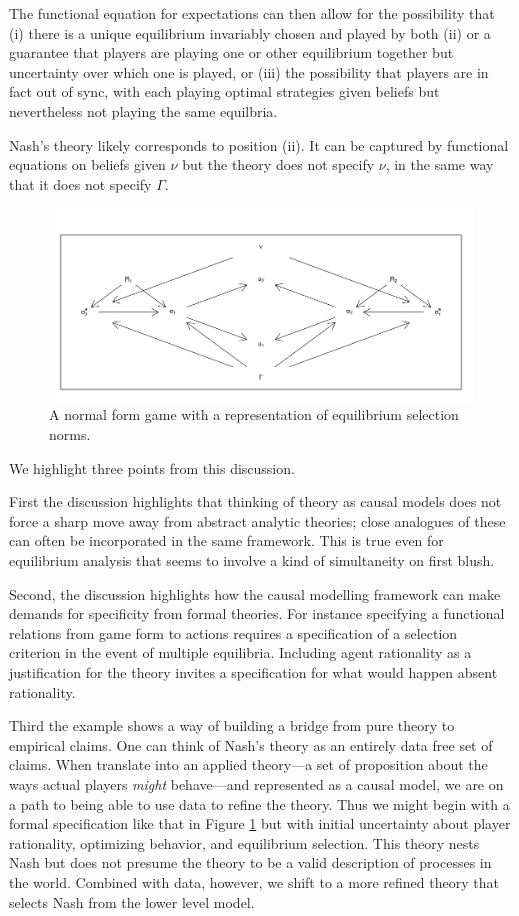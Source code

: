 \documentclass[
  12pt,
]{book}
\begin{document}
The functional equation for expectations can then allow for the possibility that (i) there is a unique equilibrium invariably chosen and played by both (ii) or a guarantee that players are playing one or other equilibrium together but uncertainty over which one is played, or (iii) the possibility that players are in fact out of sync, with each playing optimal strategies given beliefs but nevertheless not playing the same equilbria.

Nash's theory likely corresponds to position (ii). It can be captured by functional equations on beliefs given \(\nu\) but the theory does not specify \(\nu\), in the same way that it does not specify \(\Gamma\).

\begin{figure}

{\centering \includegraphics[width=0.8\linewidth]{ii_files/figure-latex/nfg5-1} 

}

\caption{A normal form game with a representation of equilibrium selection norms.}\label{fig:nfg5}
\end{figure}

We highlight three points from this discussion.

First the discussion highlights that thinking of theory as causal models does not force a sharp move away from abstract analytic theories; close analogues of these can often be incorporated in the same framework. This is true even for equilibrium analysis that seems to involve a kind of simultaneity on first blush.

Second, the discussion highlights how the causal modelling framework can make demands for specificity from formal theories. For instance specifying a functional relations from game form to actions requires a specification of a selection criterion in the event of multiple equilibria. Including agent rationality as a justification for the theory invites a specification for what would happen absent rationality.

Third the example shows a way of building a bridge from pure theory to empirical claims. One can think of Nash's theory as an entirely data free set of claims. When translate into an applied theory---a set of proposition about the ways actual players \emph{might} behave---and represented as a causal model, we are on a path to being able to use data to refine the theory. Thus we might begin with a formal specification like that in Figure \ref{fig:nfg5} but with initial uncertainty about player rationality, optimizing behavior, and equilibrium selection. This theory nests Nash but does not presume the theory to be a valid description of processes in the world. Combined with data, however, we shift to a more refined theory that selects Nash from the lower level model.
\end{document}
